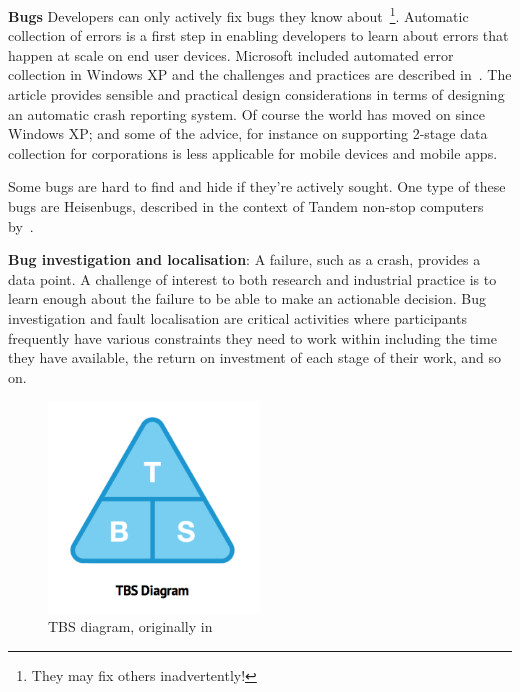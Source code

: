 \textbf{Bugs} Developers can only actively fix bugs they know about~\footnote{They may fix others inadvertently!}. Automatic collection of errors is a first step in enabling developers to learn about errors that happen at scale on end user devices. Microsoft included automated error collection in Windows XP and the challenges and practices are described in~. The article provides sensible and practical design considerations in terms of designing an automatic crash reporting system. Of course the world has moved on since Windows XP; and some of the advice, for instance on supporting 2-stage data collection for corporations is less applicable for mobile devices and mobile apps. 

Some bugs are hard to find and hide if they're actively sought. One type of these bugs are Heisenbugs, described in the context of Tandem non-stop computers by~.

\textbf{Bug investigation and localisation}: A failure, such as a crash, provides a data point. A challenge of interest to both research and industrial practice is to learn enough about the failure to be able to make an actionable decision. Bug investigation and fault localisation 
are critical activities where participants frequently have various constraints they need to work within including the time they have available, the return on investment of each stage of their work, and so on.

\begin{figure}
    \centering
    \includegraphics[width = 0.5\textwidth]{images/mobile-analytics-playbook/TBS.png}
    \caption{TBS diagram, originally in~\cite{harty_aymer_playbook_2016}}
    \label{fig:my_tbs_diagram}
\end{figure}
\afterpage{\clearpage}

